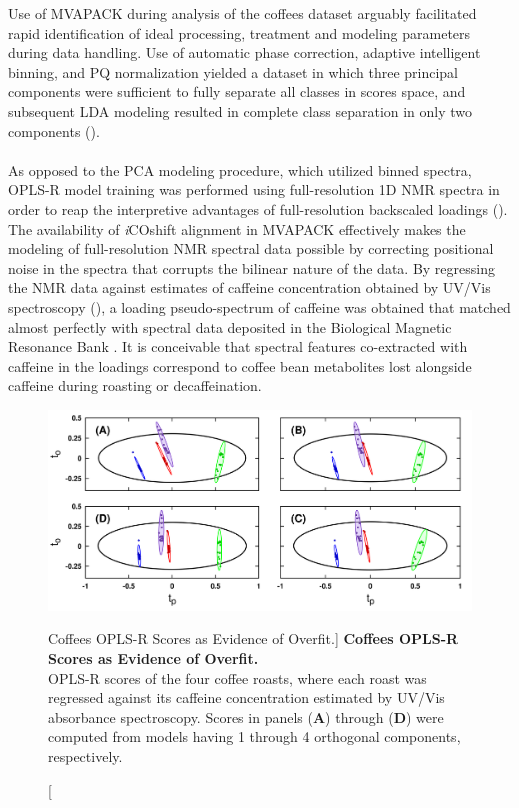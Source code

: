 \begin{doublespace}
Use of MVAPACK during analysis of the coffees dataset arguably facilitated
rapid identification of ideal processing, treatment and modeling parameters
during data handling. Use of automatic phase correction, adaptive intelligent
binning, and PQ normalization yielded a dataset in which three principal
components were sufficient to fully separate all classes in scores space,
and subsequent LDA modeling resulted in complete class separation in only
two components ().
\\\\
As opposed to the PCA modeling procedure, which utilized binned spectra,
OPLS-R model training was performed using full-resolution 1D \hnmr{} NMR
spectra in order to reap the interpretive advantages of full-resolution
backscaled loadings (). The availability of
\emph{i}COshift alignment \cite{savorani:jmr2010} in MVAPACK effectively
makes the modeling of full-resolution NMR spectral data possible by correcting
positional noise \cite{aberg:abc2009} in the spectra that corrupts the bilinear
nature of the data. By regressing the NMR data against estimates of caffeine
concentration obtained by UV/Vis spectroscopy (),
a loading pseudo-spectrum of caffeine was obtained that matched almost
perfectly with spectral data deposited in the Biological Magnetic Resonance
Bank \cite{ulrich:nar2008}. It is conceivable that spectral features
co-extracted with caffeine in the loadings correspond to coffee bean
metabolites lost alongside caffeine during roasting or decaffeination.
\end{doublespace}

\begin{figure}[H]
\includegraphics[width=6in]{figs/apps/05-oplsr-t.png}
\caption
      [Coffees OPLS-R Scores as Evidence of Overfit.]{
  {\bf Coffees OPLS-R Scores as Evidence of Overfit.}
  \\
  OPLS-R scores of the four coffee roasts, where each roast was regressed
  against its caffeine concentration estimated by UV/Vis absorbance
  spectroscopy. Scores in panels ({\bf A}) through ({\bf D}) were computed
  from models having 1 through 4 orthogonal components, respectively.
}
\label{figure.4.5}
\end{figure}

